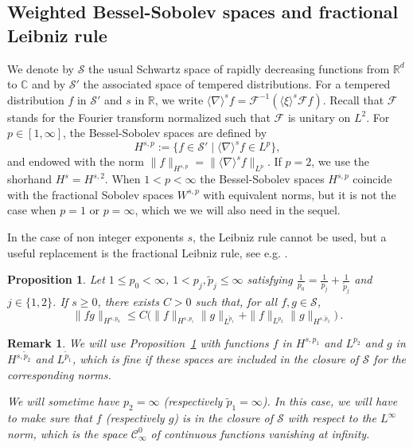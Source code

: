 \documentclass[12pt]{article}
\theoremstyle{plain}
\newtheorem{prop}[theo]{Proposition}
\newtheorem{rem}[theo]{Remark}
\begin{document}
\subsection{Weighted Bessel-Sobolev spaces and fractional Leibniz rule}\label{subsec:weighted-Bessel}

We denote by $\mathcal{S}$ the usual Schwartz space of rapidly decreasing functions from $\mathbb{R}^d$ to $\mathbb{C}$ and by $\mathcal{S}'$ the associated space of tempered distributions. For a tempered distribution $f$ in $\mathcal{S}'$ and $s$ in $\mathbb{R}$, we write $\langle \nabla \rangle^s f = \mathcal{F}^{-1}(\langle \xi \rangle^s \mathcal{F} f)$. Recall that $\mathcal{F}$ stands for the Fourier transform normalized such that $\mathcal{F}$ is unitary on $L^2$. For $p\in [1,\infty]$, the Bessel-Sobolev spaces  are defined by
\[
H^{s,p}:=\{f\in \mathcal{S}' \mid \langle \nabla \rangle^s f \in L^p\},
\]
and endowed with the norm $\|f\|_{H^{s,p}} = \|\langle \nabla \rangle^s f\|_{L^p}$.
If $p=2$, we use the shorhand $H^s=H^{s,2}$. When $1<p<\infty$ the Bessel-Sobolev spaces $H^{s,p}$ coincide with the fractional Sobolev spaces $W^{s,p}$ with equivalent norms, but it is not the case when $p=1$ or $p=\infty$, which we we will also need in the sequel. 

In the case of non integer exponents $s$, the Leibniz rule cannot be used, but a useful replacement is the fractional Leibniz rule, see e.g. \cite{grafakos_oh_2014}.

\begin{prop}
\label{prop:Leibniz-fractionnaire}
    Let $1\leq p_0<\infty$, $1<p_j,\tilde{p}_j\leq\infty$ satisfying $\frac{1}{p_0}=\frac{1}{p_j}+\frac{1}{\tilde{p}_j}$ and $j\in\{1,2\}$. If $s\ge0$,  there exists $C>0$ such that, for all $f,g\in\mathcal{S}$,
    \[
    \|fg\|_{H^{s,p_0}}  \leq C \big(  \|f\|_{H^{s,p_1}}\|g\|_{L^{\tilde{p}_1}}+\|f\|_{L^{p_2}}\|g\|_{H^{s,\tilde{p}_2}} \big)\,.
    \]
\end{prop}

\begin{rem}
    We will use Proposition~\ref{prop:Leibniz-fractionnaire} with functions $f$ in $H^{s,p_1}$ and $L^{p_2}$ and $g$ in $H^{s,\tilde{p}_2}$ and $L^{\tilde{p}_1}$,
    which is fine if these spaces are included in the closure of $\mathcal{S}$ for the corresponding norms.
    
    We will sometime have $p_2=\infty$ (respectively $\tilde{p}_1=\infty$). In this case, we will have to make sure that $f$ (respectively $g$) is in the closure of $\mathcal{S}$ with respect to the $L^\infty$ norm, which is the space $\mathcal{C}^0_{\infty}$ of continuous functions vanishing at infinity.
\end{rem}
\end{document}

